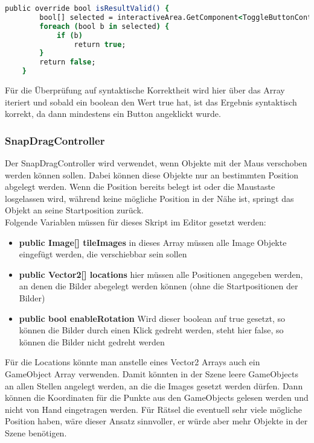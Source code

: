 {\begin{lstlisting}[language=csh, caption={isResultValid Methode in der Klasse von Rätsel 6}]
    public override bool isResultValid() {
        bool[] selected = interactiveArea.GetComponent<ToggleButtonController>().buttonStates;
        foreach (bool b in selected) {
            if (b)
                return true;
        }
        return false;
    }
\end{lstlisting}
Für die Überprüfung auf syntaktische Korrektheit wird hier über das Array iteriert und sobald ein boolean den Wert true hat, ist das Ergebnis syntaktisch korrekt, da dann mindestens ein Button angeklickt wurde.

\subsubsection{SnapDragController}
Der SnapDragController wird verwendet, wenn Objekte mit der Maus verschoben werden können sollen. Dabei können diese Objekte nur an bestimmten Position abgelegt werden. Wenn die Position bereits belegt ist oder die Maustaste losgelassen wird, während keine mögliche Position in der Nähe ist, springt das Objekt an seine Startposition zurück.\\
Folgende Variablen müssen für dieses Skript im Editor gesetzt werden:
\begin{itemize}
\item \textbf{ public Image[] tileImages} in dieses Array müssen alle Image Objekte eingefügt werden, die verschiebbar sein sollen
\item \textbf{public Vector2[] locations} hier müssen alle Positionen angegeben werden, an denen die Bilder abegelegt werden können (ohne die Startpositionen der Bilder)
\item \textbf{public bool enableRotation} Wird dieser boolean auf true gesetzt, so können die Bilder durch einen Klick gedreht werden, steht hier false, so können die Bilder nicht gedreht werden
\end{itemize}
Für die Locations könnte man anstelle eines Vector2 Arrays auch ein GameObject Array verwenden. Damit könnten in der Szene leere GameObjects an allen Stellen angelegt werden, an die die Images gesetzt werden dürfen. Dann können die Koordinaten für die Punkte aus den GameObjects gelesen werden und nicht von Hand eingetragen werden. Für Rätsel die eventuell sehr viele mögliche Position haben, wäre dieser Ansatz sinnvoller, er würde aber mehr Objekte in der Szene benötigen.

}
